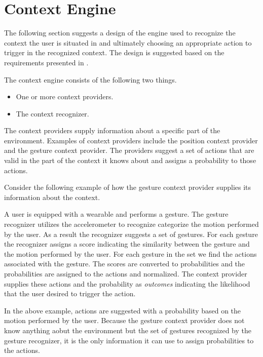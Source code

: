 \section{Context Engine}
\label{sec:design:context-engine}

The following section suggests a design of the engine used to recognize the context the user is situated in and ultimately choosing an appropriate action to trigger in the recognized context. The design is suggested based on the requirements presented in .

The context engine consists of the following two things.

\begin{itemize}
\item One or more context providers.
\item The context recognizer.
\end{itemize}

The context providers supply information about a specific part of the environment. Examples of context providers include the position context provider and the gesture context provider. The providers suggest a set of actions that are valid in the part of the context it knows about and assigns a probability to those actions.

Consider the following example of how the gesture context provider supplies its information about the context.

\begin{testexample}
A user is equipped with a wearable and performs a gesture. The gesture recognizer utilizes the accelerometer to recognize categorize the motion performed by the user. As a result the recognizer suggests a set of gestures. For each gesture the recognizer assigns a score indicating the similarity between the gesture and the motion performed by the user.
For each gesture in the set we find the actions associated with the gesture. The scores are converted to probabilities and the probabilities are assigned to the actions and normalized.
The context provider supplies these actions and the probability as \textit{outcomes} indicating the likelihood that the user desired to trigger the action.
\end{testexample}

In the above example, actions are suggested with a probability based on the motion performed by the user. Because the gesture context provider does not know anything aobut the environment but the set of gestures recognized by the gesture recognizer, it is the only information it can use to assign probabilities to the actions.

